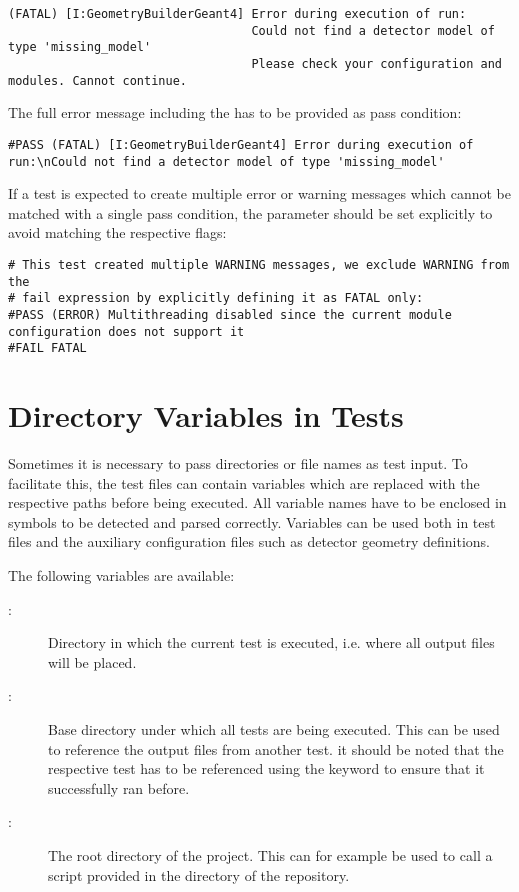 \begin{verbatim}
(FATAL) [I:GeometryBuilderGeant4] Error during execution of run:
                                  Could not find a detector model of type 'missing_model'
                                  Please check your configuration and modules. Cannot continue.
\end{verbatim}

The full error message including the  has to be provided as pass condition:

\begin{verbatim}
#PASS (FATAL) [I:GeometryBuilderGeant4] Error during execution of run:\nCould not find a detector model of type 'missing_model'
\end{verbatim}

If a test is expected to create multiple error or warning messages which cannot be matched with a single pass condition, the  parameter should be set explicitly to avoid matching the respective flags:

\begin{verbatim}
# This test created multiple WARNING messages, we exclude WARNING from the
# fail expression by explicitly defining it as FATAL only:
#PASS (ERROR) Multithreading disabled since the current module configuration does not support it
#FAIL FATAL
\end{verbatim}

\section{Directory Variables in Tests}

Sometimes it is necessary to pass directories or file names as test input.
To facilitate this, the test files can contain variables which are replaced with the respective paths before being executed.
All variable names have to be enclosed in  symbols to be detected and parsed correctly.
Variables can be used both in test files and the auxiliary configuration files such as detector geometry definitions.

The following variables are available:

\begin{description}
  \item[:] Directory in which the current test is executed, i.e. where all output files will be placed.
  \item[:] Base directory under which all tests are being executed. This can be used to reference the output files from another test. it should be noted that the respective test has to be referenced using the  keyword to ensure that it successfully ran before.
  \item[:] The root directory of the project. This can for example be used to call a script provided in the  directory of the repository.
\end{description}

